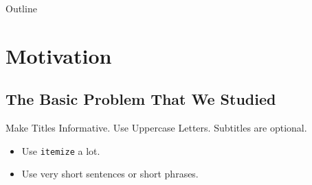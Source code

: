 \documentclass{beamer}
\title[Short Paper Title] %
{\titulo}
\subtitle{\subtitulo}
\author[] %
{\autor\inst{1} } %
\institute[] %
{
  \inst{1}%
  Department of Something\\
  University of Great Creations and Magic}
\date[] %
{DATE HERE}
\begin{document}
\begin{frame}
  \titlepage 
  \end{frame}

\begin{frame}{Outline}
  \tableofcontents
\end{frame}




% 

\section{Motivation} 
\subsection{The Basic Problem That We Studied}

\begin{frame}{Make Titles Informative. Use Uppercase Letters.}
  {Subtitles are optional.}

  \begin{itemize}
  \item
    Use \texttt{itemize} a lot.
  \item
    Use very short sentences or short phrases.
  \end{itemize}
\end{frame}
\end{document}
